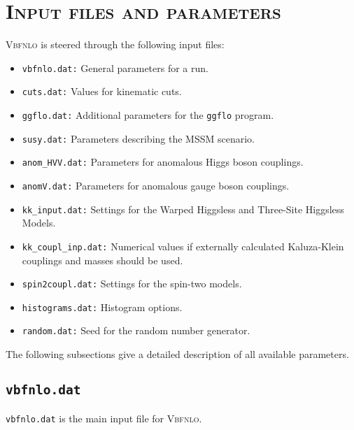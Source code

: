 \documentclass[english,12pt]{article}
\begin{document}
\section{\textsc{Input files and parameters}}
\label{sec:input} 
\textsc{Vbfnlo} is steered through the following input files:
\begin{itemize}
\item {\tt vbfnlo.dat:} General parameters for a run.
\item {\tt cuts.dat:} Values for kinematic cuts.
\item {\tt ggflo.dat:} Additional parameters for the {\tt ggflo} program.
\item {\tt susy.dat:} Parameters describing the MSSM scenario.
\item {\tt anom\_HVV.dat:} Parameters for anomalous Higgs boson couplings.
\item {\tt anomV.dat:} Parameters for anomalous gauge boson couplings.
\item {\tt kk\_input.dat:} Settings for the Warped Higgsless and
Three-Site Higgsless Models.
\item {\tt kk\_coupl\_inp.dat:} Numerical values if externally
calculated Kaluza-Klein couplings and masses should be used.
\item {\tt spin2coupl.dat:} Settings for the spin-two models.
\item {\tt histograms.dat:} Histogram options.
\item {\tt random.dat:} Seed for the random number generator.
\end{itemize}

The following subsections give a detailed description of all available parameters.


\subsection{{\tt vbfnlo.dat}}
\label{sec:vbfnlodat} 

{\tt vbfnlo.dat} is the main input file for \textsc{Vbfnlo}.
\end{document}
